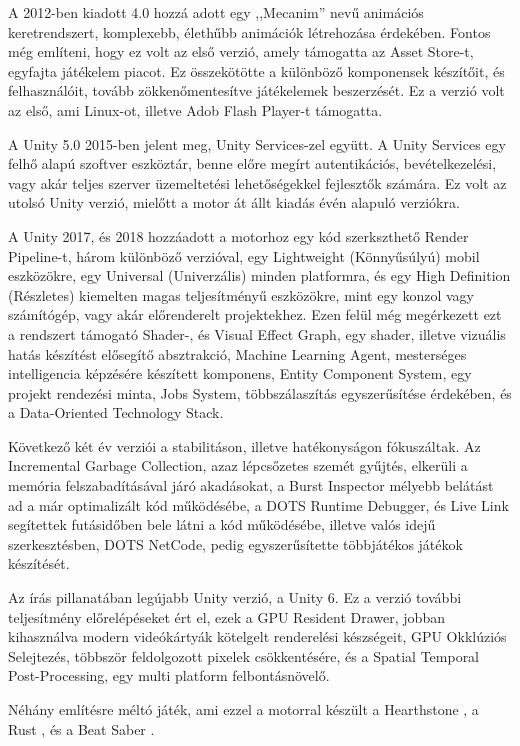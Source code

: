 \documentclass[
]{thesis-ekf}
\theoremstyle{definition}
\theoremstyle{remark}
\begin{document}
	A 2012-ben kiadott 4.0 hozzá adott egy ,,Mecanim'' nevű animációs keretrendszert, komplexebb, élethűbb animációk létrehozása érdekében. Fontos még említeni, hogy ez volt az első verzió, amely támogatta az Asset Store-t, egyfajta játékelem piacot. Ez összekötötte a különböző komponensek készítőit, és felhasználóit, tovább zökkenőmentesítve játékelemek beszerzését. Ez a verzió volt az első, ami Linux-ot, illetve Adob Flash Player-t támogatta.
	
	A Unity 5.0 2015-ben jelent meg, Unity Services-zel együtt. A Unity Services egy felhő alapú szoftver eszköztár, benne előre megírt autentikációs, bevételkezelési, vagy akár teljes szerver üzemeltetési lehetőségekkel fejlesztők számára. Ez volt az utolsó Unity verzió, mielőtt a motor át állt kiadás évén alapuló verziókra.
	
	A Unity 2017, és 2018 hozzáadott a motorhoz egy kód szerkszthető Render Pipeline-t, három különböző verzióval, egy Lightweight (Könnyűsúlyú) mobil eszközökre, egy Universal (Univerzális) minden platformra, és egy High Definition (Részletes) kiemelten magas teljesítményű eszközökre, mint egy konzol vagy számítógép, vagy akár előrenderelt projektekhez. Ezen felül még megérkezett ezt a rendszert támogató Shader-, és Visual Effect Graph, egy shader, illetve vizuális hatás készítést elősegítő absztrakció, Machine Learning Agent, mesterséges intelligencia képzésére készített komponens, Entity Component System, egy projekt rendezési minta, Jobs System, többszálaszítás egyszerűsítése érdekében, és a Data-Oriented Technology Stack. 
	
	Következő két év verziói a stabilitáson, illetve hatékonyságon fókuszáltak. Az Incremental Garbage Collection, azaz lépcsőzetes szemét gyűjtés, elkerüli a memória felszabadításával járó akadásokat, a Burst Inspector mélyebb belátást ad a már optimalizált kód működésébe, a DOTS Runtime Debugger, és Live Link segítettek futásidőben bele látni a kód működésébe, illetve valós idejű szerkesztésben, DOTS NetCode, pedig egyszerűsítette többjátékos játékok készítését. \cite{historyOfUnity}
	
	Az írás pillanatában legújabb Unity verzió, a Unity 6. Ez a verzió további teljesítmény előrelépéseket ért el, ezek a GPU Resident Drawer, jobban kihasználva modern videókártyák kötelgelt renderelési készségeit, GPU Okklúziós Selejtezés, többször feldolgozott pixelek csökkentésére, és a Spatial Temporal Post-Processing, egy multi platform felbontásnövelő. \cite{unity6IsHere}
	
	Néhány említésre méltó játék, ami ezzel a motorral készült a Hearthstone \cite{hearthstone}, a Rust \cite{rust}, és a Beat Saber \cite{beatSaber}.
	
\end{document}
